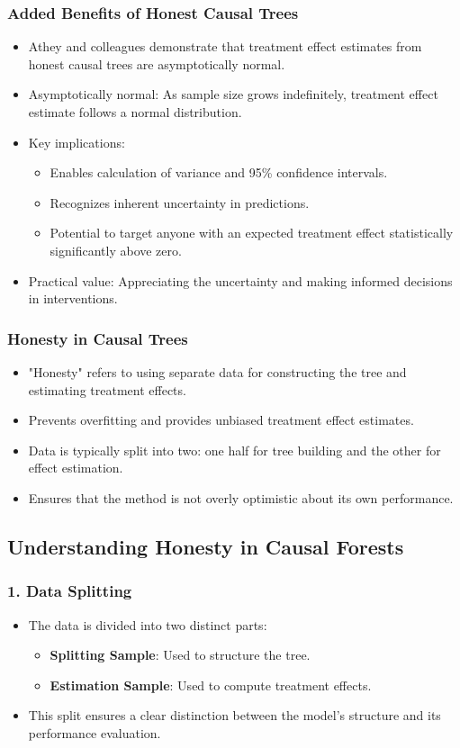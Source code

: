 \documentclass{beamer}
\begin{document}
\begin{frame}
\frametitle{Added Benefits of Honest Causal Trees}
\begin{itemize}
    \item Athey and colleagues demonstrate that treatment effect estimates from honest causal trees are asymptotically normal.
    \item Asymptotically normal: As sample size grows indefinitely, treatment effect estimate follows a normal distribution.
    \item Key implications:
    \begin{itemize}
        \item Enables calculation of variance and 95\% confidence intervals.
        \item Recognizes inherent uncertainty in predictions.
        \item Potential to target anyone with an expected treatment effect statistically significantly above zero.
    \end{itemize}
    \item Practical value: Appreciating the uncertainty and making informed decisions in interventions.
\end{itemize}
\end{frame}


\begin{frame}
\frametitle{Honesty in Causal Trees}
\begin{itemize}
    \item "Honesty" refers to using separate data for constructing the tree and estimating treatment effects.
    \item Prevents overfitting and provides unbiased treatment effect estimates.
    \item Data is typically split into two: one half for tree building and the other for effect estimation.
    \item Ensures that the method is not overly optimistic about its own performance.
\end{itemize}
\end{frame}

\subsection{Understanding Honesty in Causal Forests}

\begin{frame}
\frametitle{1. Data Splitting}
\begin{itemize}
    \item The data is divided into two distinct parts:
    \begin{itemize}
        \item \textbf{Splitting Sample}: Used to structure the tree.
        \item \textbf{Estimation Sample}: Used to compute treatment effects.
    \end{itemize}
    \item This split ensures a clear distinction between the model's structure and its performance evaluation.
\end{itemize}
\end{frame}
\end{document}
